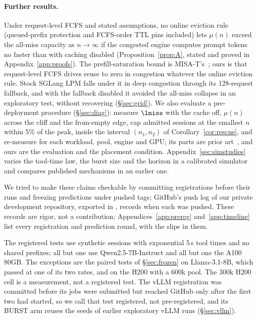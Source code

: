\paragraph{Further results.} Under request-level FCFS and stated assumptions, no online eviction rule (queued-prefix protection and FCFS-order TTL pins included) lets $\mu(n)$ exceed the all-miss capacity as $n\to\infty$ if the congested engine computes prompt tokens no faster than with caching disabled (Proposition~\ref{prop:A}, stated and proved in Appendix~\ref{app:proofs}). The prefill-saturation bound is MISA-T's~\citep{hong2026misat}; ours is that request-level FCFS drives reuse to zero in congestion whatever the online eviction rule. Stock SGLang LPM falls under it in deep congestion through its 128-request fallback, and with the fallback disabled it avoided the all-miss collapse in an exploratory test, without recovering (\S\ref{sec:grid}). We also evaluate a pre-deployment procedure (\S\ref{sec:diag}): measure $\lmiss$ with the cache off, $\mu(n)$ across the cliff and the from-empty edge, cap admitted sessions at the smallest $n$ within 5\% of the peak, inside the interval $(n_1,n_2)$ of Corollary~\ref{cor:rescue}, and re-measure for each workload, pool, engine and GPU; its parts are prior art~\citep{denning1976optimal,cherkasova2002session,maurer2015fail,chen2026concur,hong2026misat}, and ours are the evaluation and the placement condition. Appendix~\ref{sec:simstudies} varies the tool-time law, the burst size and the horizon in a calibrated simulator and compares published mechanisms in an earlier one.

We tried to make these claims checkable by committing registrations before their runs and freezing predictions under pushed tags; GitHub's push log of our private development repository, exported in , records when each was pushed. These records are rigor, not a contribution; Appendices~\ref{app:prereg} and~\ref{app:timeline} list every registration and prediction round, with the slips in them.

The registered tests use synthetic sessions with exponential 5\,s tool times and no shared prefixes; all but one use Qwen2.5-7B-Instruct and all but one the A100 80GB. The exceptions are the paired tests of \S\ref{sec:frozen} on Llama-3.1-8B, which passed at one of its two rates, and on the H200 with a 600k pool. The 300k H200 cell is a measurement, not a registered test. The vLLM registration was committed before its jobs were submitted but reached GitHub only after the first two had started, so we call that test registered, not pre-registered, and its BURST arm reuses the seeds of earlier exploratory vLLM runs (\S\ref{sec:vllm}).
